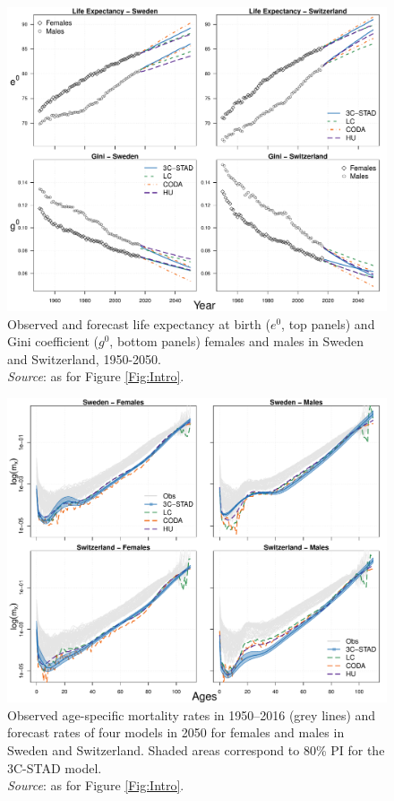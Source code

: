 \documentclass[11pt, a4paper]{article}
\begin{document}
\begin{figure}[h!]
	\begin{center}
		\includegraphics[scale=0.64]{./Figures/F4.pdf}
		\caption{Observed and forecast life expectancy at birth ($e^{0}$, top panels) and Gini coefficient ($g^{0}$, bottom panels) females and males in Sweden and Switzerland, 1950-2050. \\\footnotesize{\textit{Source}: as for Figure \ref{Fig:Intro}.} \label{Fig:e0g0fore}}		
	\end{center}
\end{figure}

\begin{figure}[h!]
	\begin{center}
		\includegraphics[scale=0.64]{./Figures/F5.pdf}
		\caption{Observed age-specific mortality rates in 1950--2016 (grey lines) and forecast rates of four models in 2050 for females and males in Sweden and Switzerland. Shaded areas correspond to 80\% PI for the 3C-STAD model. \\\footnotesize{\textit{Source}: as for Figure \ref{Fig:Intro}.} \label{Fig:LMXfore}}		
	\end{center}
\end{figure}
\end{document}
